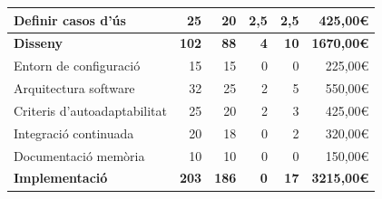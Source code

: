 \begin{table}[htb]
{\begin{tabular}{lrrrrr}
Definir casos d'ús                           & 25                                           & 20                                             & 2,5                                      & 2,5                                        & 425,00\euro                                        \\
\hline
\textbf{Disseny}                             & \textbf{102}                                 & \textbf{88}                                    & \textbf{4}                               & \textbf{10}                                & \textbf{1670,00\euro}                              \\
\hline
Entorn de configuració                       & 15                                           & 15                                             & 0                                        & 0                                          & 225,00\euro                                        \\
Arquitectura software                        & 32                                           & 25                                             & 2                                        & 5                                          & 550,00\euro                                        \\
Criteris d'autoadaptabilitat                 & 25                                           & 20                                             & 2                                        & 3                                          & 425,00\euro                                        \\
Integració continuada                        & 20                                           & 18                                             & 0                                        & 2                                          & 320,00\euro                                       \\
Documentació memòria                         & 10                                           & 10                                             & 0                                        & 0                                          & 150,00\euro                                        \\
\hline
\textbf{Implementació}                       & \textbf{203}                                 & \textbf{186}                                   & \textbf{0}                               & \textbf{17}                                & \textbf{3215,00\euro}                              \\

\end{tabular}}
\end{table}
